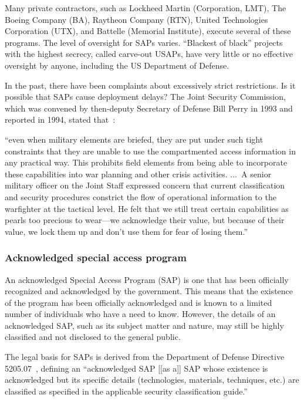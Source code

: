 Many private contractors, such as Lockheed Martin (Corporation, LMT), The Boeing Company (BA), Raytheon Company (RTN), United Technologies Corporation (UTX), and Battelle (Memorial Institute), execute several of these programs. The level of oversight for SAPs varies. ``Blackest of black'' projects with the highest secrecy, called carve-out USAPs, have very little or no effective oversight by anyone, including the US Department of Defense.

In the past, there have been complaints about excessively strict restrictions. Is it possible that SAPs cause deployment delays? The Joint Security Commission, which was convened by then-deputy Secretary of Defense Bill Perry in 1993 and reported in 1994, stated that~\cite[p.~18-19]{RedefiningSecurity}:
\begin{svgraybox}
``even when military elements are briefed, they are put under
such tight constraints that they are unable to use the compartmented access
information in any practical way. This prohibits field elements from being
able to incorporate these capabilities into war planning and other crisis activities.
$\ldots$~A senior military officer on the Joint Staff expressed concern that current
classification and security procedures constrict the flow of operational
information to the warfighter at the tactical level. He felt that we still treat
certain capabilities as pearls too precious to wear---we acknowledge their
value, but because of their value, we lock them up and don't use them for
fear of losing them.''
\end{svgraybox}

\subsubsection{Acknowledged special access program}


An acknowledged Special Access Program (SAP) is one that has been officially recognized and acknowledged by the government. This means that the existence of the program has been officially acknowledged and is known to a limited number of individuals who have a need to know. However, the details of an acknowledged SAP, such as its subject matter and nature, may still be highly classified and not disclosed to the general public.


The legal basis for SAPs is derived from the Department of Defense Directive 5205.07~\cite{DODDirective5205.07}, defining
an ``acknowledged SAP [[as a]] SAP whose existence is acknowledged but its specific details
(technologies, materials, techniques, etc.) are classified as specified in the applicable security
classification guide.''

